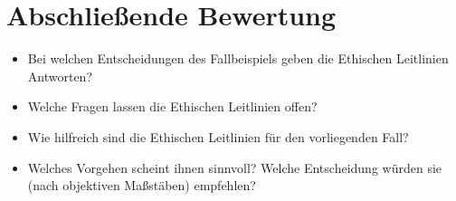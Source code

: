 \documentclass[11pt, a4paper]{scrartcl}
\begin{document}
\section{Abschließende Bewertung}
\begin{itemize}
	\item Bei welchen Entscheidungen des Fallbeispiels geben die Ethischen Leitlinien Antworten?
	\item Welche Fragen lassen die Ethischen Leitlinien offen?
	\item Wie hilfreich sind die Ethischen Leitlinien für den vorliegenden Fall?
	\item Welches Vorgehen scheint ihnen sinnvoll? Welche Entscheidung würden sie (nach objektiven Maßstäben) empfehlen?
\end{itemize}
\end{document}
